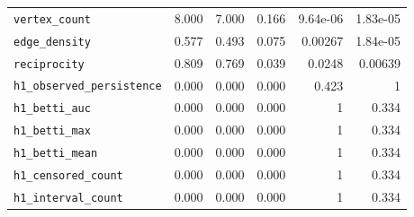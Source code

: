 \documentclass{article}
\begin{document}
\begin{table}[htbp]
\begin{tabular}{lrrrrr}
\rowcolor{green!15}\verb|vertex_count|            &            8.000 &             7.000 &        0.166 &  9.64e-06 &  1.83e-05 \\
\rowcolor{green!15}\verb|edge_density|            &            0.577 &             0.493 &        0.075 &    0.00267 &  1.84e-05 \\
\rowcolor{green!15}\verb|reciprocity|             &            0.809 &             0.769 &        0.039 &    0.0248 &    0.00639 \\
\verb|h1_observed_persistence| &            0.000 &             0.000 &        0.000 &    0.423 &         1 \\
\verb|h1_betti_auc|            &            0.000 &             0.000 &        0.000 &         1 &    0.334 \\
\verb|h1_betti_max|            &            0.000 &             0.000 &        0.000 &         1 &    0.334 \\
\verb|h1_betti_mean|           &            0.000 &             0.000 &        0.000 &         1 &    0.334 \\
\verb|h1_censored_count|       &            0.000 &             0.000 &        0.000 &         1 &    0.334 \\
\verb|h1_interval_count|       &            0.000 &             0.000 &        0.000 &         1 &    0.334 \\
\bottomrule
\end{tabular}
\end{table}

\vspace{2em}

\begin{table}[htbp]
\centering
\caption{Metrics of the rhythm view that pass the independent pairwise FDR (Open Focus-Classical, 180s)}
\label{tab:rhythm_rank_biserial}
\renewcommand{\arraystretch}{1.5}
\end{table}
\end{document}
